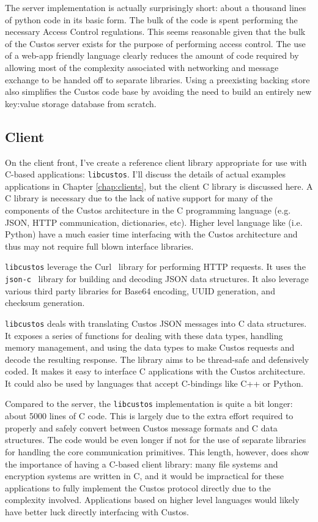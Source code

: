 The server implementation is actually surprisingly short: about a
thousand lines of python code in its basic form. The bulk of the code
is spent performing the necessary Access Control regulations. This
seems reasonable given that the bulk of the Custos server exists for
the purpose of performing access control. The use of a web-app
friendly language clearly reduces the amount of code required by
allowing most of the complexity associated with networking and message
exchange to be handed off to separate libraries. Using a preexisting
backing store also simplifies the Custos code base by avoiding the
need to build an entirely new key:value storage database from scratch.

\subsection{Client}

On the client front, I've create a reference client library
appropriate for use with C-based applications:
\texttt{libcustos}. I'll discuss the details of actual examples
applications in Chapter \ref{chap:clients}, but the client C library
is discussed here. A C library is necessary due to the lack of native
support for many of the components of the Custos architecture in the C
programming language (e.g. JSON, HTTP communication, dictionaries,
etc). Higher level language like (i.e. Python) have a much easier time
interfacing with the Custos architecture and thus may not require full
blown interface libraries.

\texttt{libcustos} leverage the Curl~\cite{curl} library for
performing HTTP requests. It uses the \texttt{json-c}~\cite{json-c}
library for building and decoding JSON data structures. It also
leverage various third party libraries for Base64 encoding, UUID
generation, and checksum generation.

\texttt{libcustos} deals with translating Custos JSON messages into C
data structures. It exposes a series of functions for dealing with
these data types, handling memory management, and using the data types
to make Custos requests and decode the resulting response. The library
aims to be thread-safe and defensively coded. It makes it easy to
interface C applications with the Custos architecture. It could also
be used by languages that accept C-bindings like C++ or Python.

Compared to the server, the \texttt{libcustos} implementation is quite
a bit longer: about 5000 lines of C code. This is largely due to the
extra effort required to properly and safely convert between Custos
message formats and C data structures. The code would be even longer
if not for the use of separate libraries for handling the core
communication primitives. This length, however, does show the
importance of having a C-based client library: many file systems and
encryption systems are written in C, and it would be impractical for
these applications to fully implement the Custos protocol directly due
to the complexity involved. Applications based on higher level
languages would likely have better luck directly interfacing with
Custos.

